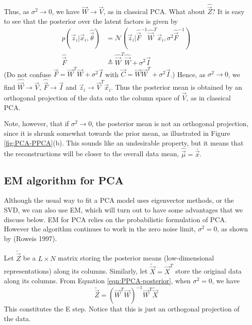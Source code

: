 Thus, as $\sigma^2 \rightarrow 0$, we have $\hat{\vec{W}} \rightarrow \vec{V}$, as in classical PCA. What about $\hat{\vec{Z}}$? It is easy to see that the posterior over the latent factors is given by
\begin{align}
p(\vec{z}_i|\vec{x}_i,\hat{\vec{\theta}}) & = \mathcal{N}(\vec{z}_i|\hat{\vec{F}}^{-1}\hat{\vec{W}}^T\vec{x}_i,\sigma^2\hat{\vec{F}}^{-1}) \label{eqn:PPCA-posterior}\\
\hat{\vec{F}} & \triangleq \hat{\vec{W}}^T\hat{\vec{W}}+\sigma^2\vec{I}
\end{align}
(Do not confuse $\vec{F} = \vec{W}^T\vec{W}+\sigma^2\vec{I}$ with $\vec{C}=\vec{W}\vec{W}^T+\sigma^2\vec{I}$.) Hence, as $\sigma^2 \rightarrow 0$, we find $\hat{\vec{W}} \rightarrow \vec{V}$, $\hat{\vec{F}} \rightarrow \vec{I}$ and $\vec{z}_i \rightarrow \vec{V}^T\vec{x}_i$. Thus the posterior mean is obtained by an orthogonal projection of the data onto the column space of $\vec{V}$, as in classical PCA.

Note, however, that if $\sigma^2 \rightarrow 0$, the posterior mean is not an orthogonal projection, since it is shrunk somewhat towards the prior mean, as illustrated in Figure \ref{fig:PCA-PPCA}(b). This sounds like an undesirable property, but it means that the reconstructions will be closer to the overall data mean, $\hat{\vec{\mu}}=\bar{\vec{x}}$.


\subsection{EM algorithm for PCA}
\label{sec:EM-for-PCA}
Although the usual way to fit a PCA model uses eigenvector methods, or the SVD, we can also use EM, which will turn out to have some advantages that we discuss below. EM for PCA relies on the probabilistic formulation of PCA. However the algorithm continues to work in the zero noise limit, $\sigma^2=0$, as shown by (Roweis 1997).

Let $\tilde{\vec{Z}}$ be a $L \times N$ matrix storing the posterior means (low-dimensional representations) along its columns. Similarly, let $\tilde{\vec{X}}=\vec{X}^T$ store the original data along its columns. From Equation \ref{eqn:PPCA-posterior}, when $\sigma^2=0$, we have
\begin{equation}
\tilde{\vec{Z}}=(\vec{W}^T\vec{W})^{-1}\vec{W}^T\tilde{\vec{X}}
\end{equation}
This constitutes the E step. Notice that this is just an orthogonal projection of the data.

